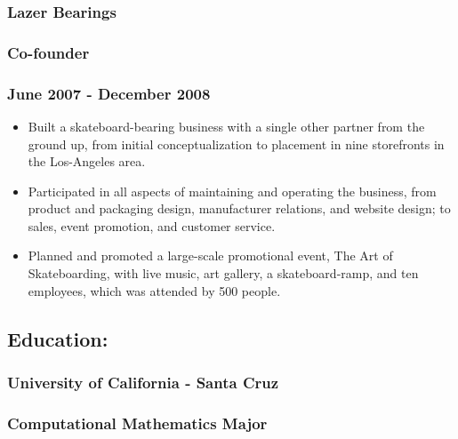 \hypertarget{lazer-bearings}{%
\subsubsection{Lazer Bearings}\label{lazer-bearings}}

\hypertarget{co-founder}{%
\subsubsection{Co-founder}\label{co-founder}}

\hypertarget{june-2007---december-2008}{%
\subsubsection{June 2007 - December
2008}\label{june-2007---december-2008}}

\begin{itemize}
\tightlist
\item
  Built a skateboard-bearing business with a single other partner from
  the ground up, from initial conceptualization to placement in nine
  storefronts in the Los-Angeles area.
\item
  Participated in all aspects of maintaining and operating the business,
  from product and packaging design, manufacturer relations, and website
  design; to sales, event promotion, and customer service.
\item
  Planned and promoted a large-scale promotional event, The Art of
  Skateboarding, with live music, art gallery, a skateboard-ramp, and
  ten employees, which was attended by 500 people.
\end{itemize}

\hypertarget{education}{%
\subsection{Education:}\label{education}}

\hypertarget{university-of-california---santa-cruz}{%
\subsubsection{University of California - Santa
Cruz}\label{university-of-california---santa-cruz}}

\hypertarget{computational-mathematics-major}{%
\subsubsection{Computational Mathematics
Major}\label{computational-mathematics-major}}

